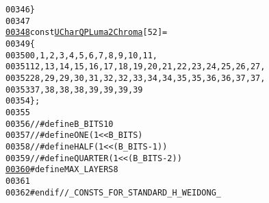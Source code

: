 \begin{footnotesize}
\begin{alltt}
00346 \}
00347 
\hypertarget{_consts4_standard_8h_source_l00348}{}\hyperlink{_consts4_standard_8h_a764e5d7924eac5d10266946aa1d1c695}{00348} \textcolor{keyword}{const} \hyperlink{_types_8h_ac7cdb549645a4e51f5efa2fca122cc60}{UChar} \hyperlink{_consts4_standard_8h_a764e5d7924eac5d10266946aa1d1c695}{QPLuma2Chroma}[52]=
00349 \{
00350         0, 1, 2, 3, 4, 5, 6, 7, 8, 9,10,11,
00351         12,13,14,15,16,17,18,19,20,21,22,23,24,25,26,27,
00352         28,29,29,30,31,32,32,33,34,34,35,35,36,36,37,37,
00353         37,38,38,38,39,39,39,39
00354 \};
00355 
00356 \textcolor{comment}{// #define B\_BITS 10}
00357 \textcolor{comment}{// #define ONE (1 << B\_BITS)}
00358 \textcolor{comment}{// #define HALF (1 << (B\_BITS - 1))}
00359 \textcolor{comment}{// #define QUARTER (1 << (B\_BITS - 2))}
\hypertarget{_consts4_standard_8h_source_l00360}{}\hyperlink{_consts4_standard_8h_ade9d4b2ac5f29fe89ffea40e7c58c9d6}{00360} \textcolor{preprocessor}{#define MAX\_LAYERS 8}
00361 \textcolor{preprocessor}{}
00362 \textcolor{preprocessor}{#endif //\_CONSTS\_FOR\_STANDARD\_H\_WEIDONG\_}
\end{alltt}\end{footnotesize}
